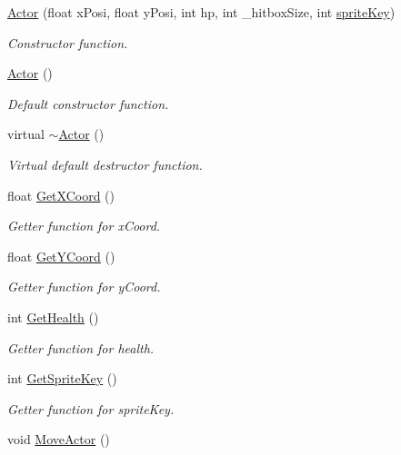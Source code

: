 \begin{DoxyCompactItemize}
\item 
\hyperlink{class_actor_a109f99625e52500bf99a94d4f097ad0b}{Actor} (float x\+Posi, float y\+Posi, int hp, int \+\_\+hitbox\+Size, int \hyperlink{class_actor_a87edc76c25d94d8d8c3a09712d554c12}{sprite\+Key})
\begin{DoxyCompactList}\small\item\em Constructor function. \end{DoxyCompactList}\item 
\hyperlink{class_actor_a2a0ff4335a1ee9096df90f288c026c8b}{Actor} ()
\begin{DoxyCompactList}\small\item\em Default constructor function. \end{DoxyCompactList}\item 
virtual \hyperlink{class_actor_ad807fe8f85e72ab263a0c05e3231cb39}{$\sim$\+Actor} ()
\begin{DoxyCompactList}\small\item\em Virtual default destructor function. \end{DoxyCompactList}\item 
float \hyperlink{class_actor_a11aaf02239c93ddb984190de26c42524}{Get\+X\+Coord} ()
\begin{DoxyCompactList}\small\item\em Getter function for x\+Coord. \end{DoxyCompactList}\item 
float \hyperlink{class_actor_a4462d34b9df911fda0b3221819433951}{Get\+Y\+Coord} ()
\begin{DoxyCompactList}\small\item\em Getter function for y\+Coord. \end{DoxyCompactList}\item 
int \hyperlink{class_actor_aabeae30dc510867f0ef39d041f566386}{Get\+Health} ()
\begin{DoxyCompactList}\small\item\em Getter function for health. \end{DoxyCompactList}\item 
int \hyperlink{class_actor_ad36330f5205adfc8a63d79fda3115912}{Get\+Sprite\+Key} ()
\begin{DoxyCompactList}\small\item\em Getter function for sprite\+Key. \end{DoxyCompactList}\item 
void \hyperlink{class_actor_aca64c3d23f52600990f808e5f7ee85eb}{Move\+Actor} ()

\end{DoxyCompactItemize}
